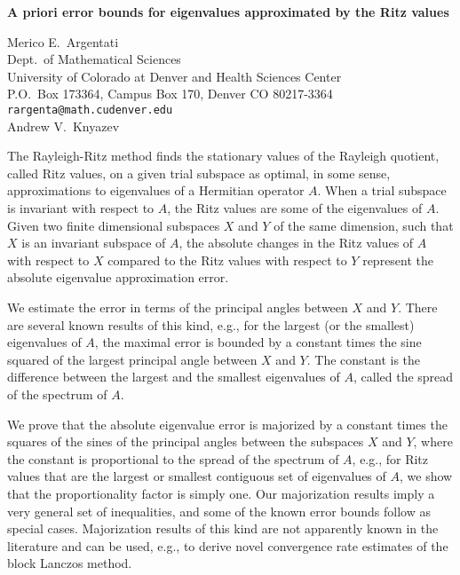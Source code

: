 \documentclass[twosided]{report}
\begin{document}
\begin{center}
{\large			%
{\bf A priori error bounds for eigenvalues approximated by the Ritz values}}

	Merico E.~Argentati \\
	Dept.~of Mathematical Sciences \\
	 University of Colorado at Denver and Health Sciences Center \\
	 P.O.~Box 173364, Campus Box 170, Denver CO 80217-3364 \\
	{\tt rargenta@math.cudenver.edu} \\
	Andrew V.~Knyazev
\end{center}
The Rayleigh-Ritz method finds the stationary values of the
Rayleigh quotient, called Ritz values, on a given trial
subspace as optimal, in some sense, approximations to
eigenvalues of a Hermitian operator $A$. When a trial subspace
is invariant with respect to $A$, the Ritz values are some of
the eigenvalues of $A$. Given two finite dimensional subspaces
$X$ and $Y$ of the same dimension, such that $X$ is an invariant
subspace of $A$, the absolute changes in the Ritz values of $A$
with respect to $X$ compared to the Ritz values with respect
to $Y$ represent the absolute eigenvalue approximation error.

We estimate the error in terms of the principal angles
between $X$ and $Y$. There are several known results of this
kind, e.g., for the largest (or the smallest) eigenvalues of
$A$, the maximal error is bounded by a constant times the sine
squared of the largest principal angle between $X$ and $Y$. The
constant is the difference between the largest and the
smallest eigenvalues of $A$, called the spread of the spectrum
of $A$.

We prove that the absolute eigenvalue error is
majorized by a constant times the squares of the sines of
the principal angles between the subspaces $X$ and $Y$, where
the constant is proportional to the spread of the spectrum
of $A$, e.g., for Ritz values that are the largest or smallest
contiguous set of eigenvalues of $A$, we show that the
proportionality factor is simply one. Our majorization
results imply a very general set of inequalities, and some
of the known error bounds follow as special cases.
Majorization results of this kind are not apparently known
in the literature and can be used, e.g., to derive novel
convergence rate estimates of the block Lanczos method.
\end{document}
